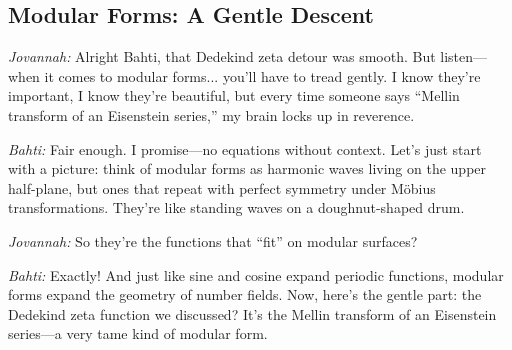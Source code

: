 % 
% 
% 
% 
% 
% 
% 
% 
% 
% 
% 
% 
% 
\subsection*{Modular Forms: A Gentle Descent}
\textit{Jovannah:} Alright Bahti, that Dedekind zeta detour was smooth. But listen—when it comes to modular forms... you'll have to tread gently. I know they're important, I know they’re beautiful, but every time someone says “Mellin transform of an Eisenstein series,” my brain locks up in reverence.

\medskip

\noindent
\textit{Bahti:} Fair enough. I promise—no equations without context. Let’s just start with a picture: think of modular forms as harmonic waves living on the upper half-plane, but ones that repeat with perfect symmetry under Möbius transformations. They’re like standing waves on a doughnut-shaped drum.

\medskip

\noindent
\textit{Jovannah:} So they’re the functions that “fit” on modular surfaces?

\medskip

\noindent
\textit{Bahti:} Exactly! And just like sine and cosine expand periodic functions, modular forms expand the geometry of number fields. Now, here’s the gentle part: the Dedekind zeta function we discussed? It’s the Mellin transform of an Eisenstein series—a very tame kind of modular form.

